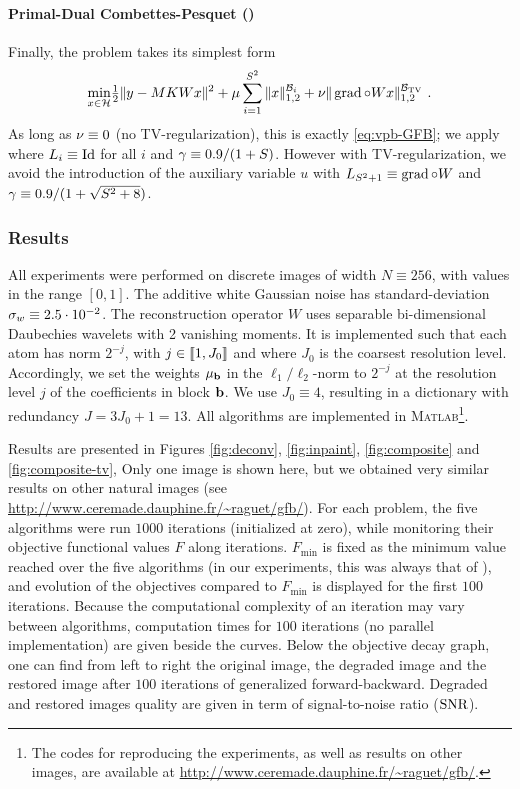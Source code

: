 \paragraph{Primal-Dual Combettes-Pesquet (\CoPe)} Finally, the problem takes its simplest form
%
\begin{equation}\label{eq:vpb-CoPe}
 \umin{x \in \Hh} \half \norm{y - \Mr \Ks W x}^2 + \musp \sum_{i=1}^{S^2} \normbki{x} + \mutv \normbktv{\gradient \circ W x}~.
\end{equation}
%
As long as $\nu \equiv 0$ (no TV-regularization), this is exactly \eqref{eq:vpb-GFB}; we apply  where $L_i \equiv \operatorname{Id}$ for all $i$ and $\gamma \equiv 0.9/(1+S)$. However with TV-regularization, we avoid the introduction of the auxiliary variable $u$ with $L_{S^2+1} \equiv \operatorname{grad} \circ W$ and $\gamma \equiv 0.9/(1+\sqrt{S^2 + 8})$.

	\subsubsection{Results}

All experiments were performed on discrete images of width $N \equiv 256$, with values in the range $[0,1]$. The additive white Gaussian noise has standard-deviation $\sigma_w \equiv 2.5 \cdot 10^{-2}$. The reconstruction operator $W$ uses separable bi-dimensional Daubechies wavelets with 2 vanishing moments. It is implemented such that each atom has norm $2^{-j}$, with $j \in \llbracket1,J_0\rrbracket$ and where $J_0$ is the coarsest resolution level. Accordingly, we set the weights $\mu_{\mathbf{b}}$ in the $\ell_1/\ell_2$-norm to $2^{-j}$ at the resolution level $j$ of the coefficients in block $\mathbf{b}$. We use $J_0 \equiv 4$, resulting in a dictionary with redundancy $J = 3 J_0 +1 = 13$. All algorithms are implemented in \textsc{Matlab}\footnote{The codes for reproducing the experiments, as well as results on other images, are available at \url{http://www.ceremade.dauphine.fr/~raguet/gfb/}.}.

Results are presented in Figures \ref{fig:deconv}, \ref{fig:inpaint}, \ref{fig:composite} and \ref{fig:composite-tv}, %
Only one image is shown here, but we obtained very similar results on other natural images (see \url{http://www.ceremade.dauphine.fr/~raguet/gfb/}). For each problem, the five algorithms were run $1000$ iterations (initialized at zero), while monitoring their objective functional values $F$ along iterations. $F_{\min}$ is fixed as the minimum value reached over the five algorithms (in our experiments, this was always that of \GFB), and evolution of the objectives compared to $F_{\min}$ is displayed for the first $100$ iterations. Because the computational complexity of an iteration may vary between algorithms, computation times for $100$ iterations (no parallel implementation) are given beside the curves. Below the objective decay graph, one can find from left to right the original image, the degraded image and the restored image after $100$ iterations of generalized forward-backward. Degraded and restored images quality are given in term of signal-to-noise ratio ($\mathrm{SNR}$).
 
